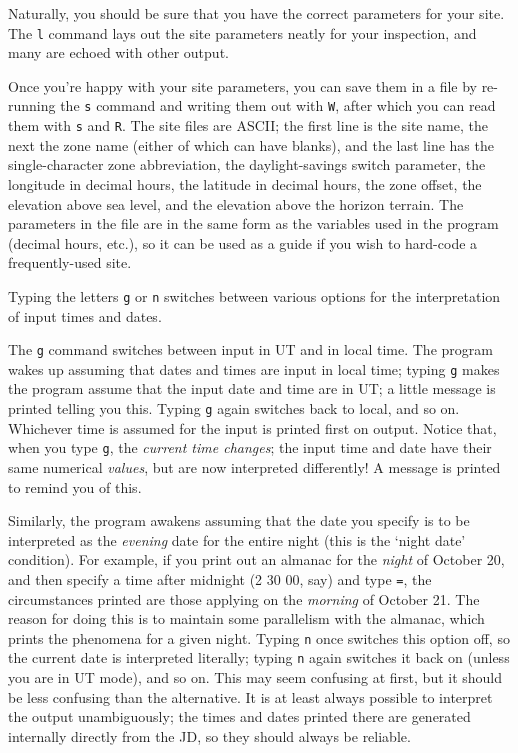 Naturally, you should be sure that you have the correct parameters
for your site.  The {\tt l} command lays out the site parameters
neatly for your inspection, and many are echoed with other output.

Once you're happy with your site parameters, you can save them in 
a file by re-running the {\tt s} command and writing them out with
{\tt W}, after which you can read them with {\tt s} and {\tt R}.
The site files are ASCII; the first line is the site name, the
next the zone name (either of which can have blanks), and the 
last line has the single-character zone abbreviation, the
daylight-savings switch parameter, the longitude in decimal hours,
the latitude in decimal hours, the zone offset, the elevation above
sea level, and the elevation above the horizon terrain.  The
parameters in the file are in the same form as the variables
used in the program (decimal hours, etc.), so it can be used as 
a guide if you wish to hard-code a frequently-used site.


Typing the letters {\tt g} or {\tt n} switches between various options for
the interpretation of input times and dates.  

The {\tt g} command switches between input in UT and in local time.
The program wakes up assuming that dates and times are input
in local time; typing {\tt g} makes the program assume that the
input date and time are in UT; a little message is printed
telling you this.  Typing {\tt g} again switches back to local, and
so on.  Whichever time is assumed for the input is printed
first on output.  Notice that, when you type {\tt g}, the {\it current
time changes}; the input time and date have their same
numerical {\it values}, but are now interpreted differently!  A
message is printed to remind you of this.

Similarly, the program awakens assuming that the date you specify is
to be interpreted as the
{\it evening\/} date for the entire night (this is the `night date'
condition).  For example, if you
print out an almanac for the {\it night\/} of October 20, and then specify a
time after midnight (2 30 00, say) and type {\tt =}, the
circumstances printed are those applying on the {\it morning} of October 21.
The reason for doing this is to maintain some parallelism with the
almanac, which prints the phenomena for a given night.  Typing
{\tt n} once switches this option off, so the current date is interpreted
literally; typing {\tt n} again switches it back on (unless you are
in UT mode), and so on.  This may seem confusing at first, but it
should be less confusing than the alternative.  It is at least
always possible to interpret the output unambiguously; the times
and dates printed there are generated internally directly from the
JD, so they should always be reliable.

